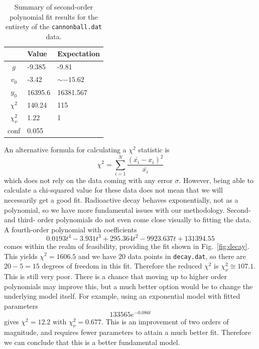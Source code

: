 \documentclass{article}
\begin{document}
\begin{table}[H]
    \centering
    \begin{tabular}{c|l|l}
         & Value & Expectation \\
        \hline
        $g$ & -9.385 & -9.81 \\
        $v_0$ & -3.42 & $\sim-15.62$ \\
        $y_0$ & 16395.6 & 16381.567 \\
        $\chi^2$ & 140.24 & 115 \\
        $\chi_\nu^2$ & 1.22 & 1 \\
        conf & 0.055 &
    \end{tabular}
    \caption{Summary of second-order polynomial fit results for the entirety of the \texttt{cannonball.dat} data.}
    \label{tab:fit1}
\end{table}

\bigskip
{}
\medskip

An alternative formula for calculating a $\chi^2$ statistic is \begin{equation*}
    \chi^2 = \sum_{i=1}^N \frac{(\bar{x_i}-x_i)^2}{\bar{x_i}}
\end{equation*}
which does not rely on the data coming with any error $\sigma$. However, being able to calculate a chi-squared value for these data does not mean that we will necessarily get a good fit. Radioactive decay behaves exponentially, not as a polynomial, so we have more fundamental issues with our methodology. Second- and third- order polynomials do not even come close visually to fitting the data. A fourth-order polynomial with coefficients \begin{equation*}
    0.0193t^4 - 3.931t^3 + 295.364t^2 - 9923.637t + 131394.55
\end{equation*}
comes within the realm of feasibility, providing the fit shown in Fig.~\ref{fig:decay}. This yields $\chi^2=1606.5$ and we have 20 data points in \texttt{decay.dat}, so there are $20-5=15$ degrees of freedom in this fit. Therefore the reduced $\chi^2$ is $\chi_\nu^2 \cong 107.1$. This is still very poor. There is a chance that moving up to higher order polynomials may improve this, but a much better option would be to change the underlying model itself. For example, using an exponential model with fitted parameters \begin{equation*}
    133565e^{-0.086t}
\end{equation*}
gives $\chi^2=12.2$ with $\chi_\nu^2 = 0.677$. This is an improvement of two orders of magnitude, and requires fewer parameters to attain a much better fit. Therefore we can conclude that this is a better fundamental model. 
\end{document}
